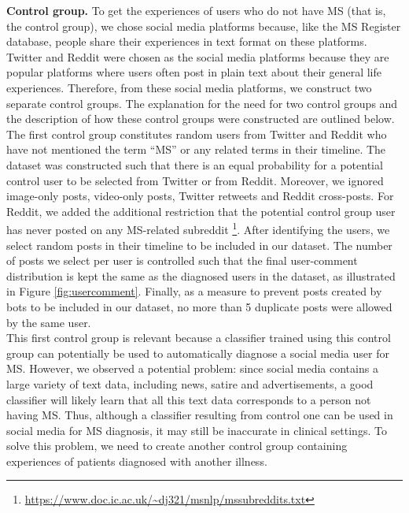 \documentclass[11pt,a4paper]{article}
\begin{document}
\indent \textbf{Control group.} To get the experiences of users who do not have MS (that is, the control group), we chose social media platforms because, like the MS Register database, people share their experiences in text format on these platforms. Twitter and Reddit were chosen as the social media platforms because they are popular platforms where users often post in plain text about their general life experiences. Therefore, from these social media platforms, we construct two separate control groups. The explanation for the need for two control groups and the description of how these control groups were constructed are outlined below. \\
\indent The first control group constitutes random users from Twitter and Reddit who have not mentioned the term “MS” or any related terms in their timeline. The dataset was constructed such that there is an equal probability for a potential control user to be selected from Twitter or from Reddit. Moreover, we ignored image-only posts, video-only posts, Twitter retweets and Reddit cross-posts. For Reddit, we added the additional restriction that the potential control group user has never posted on any MS-related subreddit \footnote{\url{https://www.doc.ic.ac.uk/~dj321/msnlp/mssubreddits.txt}}. After identifying the users, we select random posts in their timeline to be included in our dataset. The number of posts we select per user is controlled such that the final user-comment distribution is kept the same as the diagnosed users in the dataset, as illustrated in Figure \ref{fig:usercomment}. Finally, as a measure to prevent posts created by bots to be included in our dataset, no more than 5 duplicate posts were allowed by the same user. \\
\indent This first control group is relevant because a classifier trained using this control group can potentially be used to automatically diagnose a social media user for MS. However, we observed a potential problem: since social media contains a large variety of text data, including news, satire and advertisements, a good classifier will likely learn that all this text data corresponds to a person not having MS. Thus, although a classifier resulting from control one can be used in social media for MS diagnosis, it may still be inaccurate in clinical settings. To solve this problem, we need to create another control group containing experiences of patients diagnosed with another illness. \\
\end{document}
